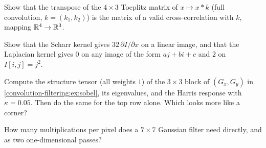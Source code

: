 \begin{notechapter}
\begin{exercise}\label{convolution-filtering:exr:2}
Show that the transpose of the $4\times3$ Toeplitz matrix of $x\mapsto x * k$ (full convolution, $k = (k_1,k_2)$) is the
matrix of a valid cross-correlation with $k$, mapping $\mathbb{R}^4\to\mathbb{R}^3$.
\end{exercise}

\begin{exercise}\label{convolution-filtering:exr:3}
Show that the Scharr kernel gives $32\,\partial I/\partial x$ on a linear image, and that the Laplacian kernel gives $0$ on
any image of the form $aj + bi + c$ and $2$ on $I[i,j] = j^2$.
\end{exercise}

\begin{exercise}\label{convolution-filtering:exr:4}
Compute the structure tensor (all weights $1$) of the $3\times3$ block of $(G_x, G_y)$ in
\cref{convolution-filtering:ex:sobel}, its eigenvalues, and the Harris response with $\kappa = 0.05$. Then do the
same for the top row alone. Which looks more like a corner?
\end{exercise}

\begin{exercise}\label{convolution-filtering:exr:5}
How many multiplications per pixel does a $7\times7$ Gaussian filter need directly, and as two
one-dimensional passes?
\end{exercise}
\end{notechapter}

